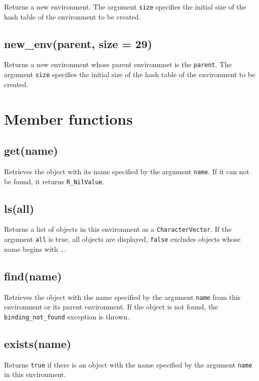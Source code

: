 \documentclass[]{book}
\theoremstyle{definition}
\theoremstyle{definition}
\theoremstyle{remark}
\begin{document}
Returns a new environment. The argument \texttt{size} specifies the
initial size of the hash table of the environment to be created.

\subsection{new\_env(parent, size = 29)}\label{new_envparent-size-29}

Returns a new environment whose parent environmnet is the
\texttt{parent}. The argument \texttt{size} specifies the initial size
of the hash table of the environment to be created.

\section{Member functions}\label{member-functions-8}

\subsection{get(name)}\label{getname}

Retrieves the object with its name specified by the argument
\texttt{name}. If it can not be found, it returns \texttt{R\_NilValue}.

\subsection{ls(all)}\label{lsall}

Returns a list of objects in this environment as a
\texttt{CharacterVector}. If the argument \texttt{all} is true, all
objects are displayed, \texttt{false} excludes objects whose name begins
with \texttt{.}.

\subsection{find(name)}\label{findname}

Retrieves the object with the name specified by the argument
\texttt{name} from this environment or its parent environment. If the
object is not found, the \texttt{binding\_not\_found} exception is
thrown.

\subsection{exists(name)}\label{existsname}

Returns \texttt{true} if there is an object with the name specified by
the argument \texttt{name} in this environment.
\end{document}
